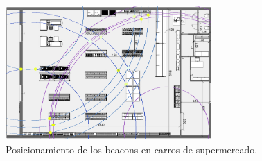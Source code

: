 \documentclass[paper=a4, fontsize=11pt,twoside]{scrartcl}	%
\begin{document}
                \begin{center}
                    \begin{figure}[h]
                        \centering
                        \includegraphics[width=0.7\textwidth]{agrupation_3.PNG}
                        \caption{Posicionamiento de los beacons en carros de supermercado.}
                        \label{fig:mesh7}
                    \end{figure}
                \end{center}
                \paragraph{}
\end{document}
